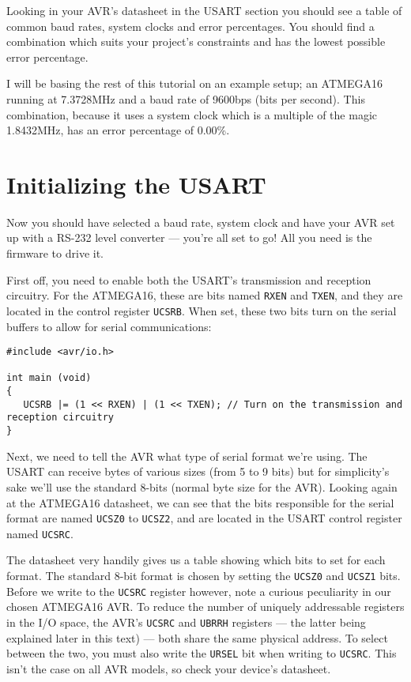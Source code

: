 \documentclass[a4paper,oneside]{book}
\begin{document}
Looking in your AVR's datasheet in the USART section you should see a table of common baud rates, system clocks and error percentages. You should find a combination which suits your project's constraints and has the lowest possible error percentage.

I will be basing the rest of this tutorial on an example setup; an ATMEGA16 running at 7.3728MHz and a baud rate of 9600bps (bits per second). This combination, because it uses a system clock which is a multiple of the magic 1.8432MHz, has an error percentage of 0.00\%.


\chapter{Initializing the USART}

Now you should have selected a baud rate, system clock and have your AVR set up with a RS-232 level converter --- you're all set to go! All you need is the firmware to drive it.

First off, you need to enable both the USART's transmission and reception circuitry. For the ATMEGA16, these are bits named \texttt{RXEN} and \texttt{TXEN}, and they are located in the control register \texttt{UCSRB}. When set, these two bits turn on the serial buffers to allow for serial communications:

\begin{center}
\begin{lstlisting}
#include <avr/io.h>

int main (void)
{
   UCSRB |= (1 << RXEN) | (1 << TXEN); // Turn on the transmission and reception circuitry
}
\end{lstlisting}
\end{center}

Next, we need to tell the AVR what type of serial format we're using. The USART can receive bytes of various sizes (from 5 to 9 bits) but for simplicity's sake we'll use the standard 8-bits (normal byte size for the AVR). Looking again at the ATMEGA16 datasheet, we can see that the bits responsible for the serial format are named \texttt{UCSZ0} to \texttt{UCSZ2}, and are located in the USART control register named \texttt{UCSRC}.

The datasheet very handily gives us a table showing which bits to set for each format. The standard 8-bit format is chosen by setting the \texttt{UCSZ0} and \texttt{UCSZ1} bits. Before we write to the \texttt{UCSRC} register however, note a curious peculiarity in our chosen ATMEGA16 AVR. To reduce the number of uniquely addressable registers in the I/O space, the AVR's \texttt{UCSRC} and \texttt{UBRRH} registers --- the latter being explained later in this text) --- both share the same physical address. To select between the two, you must also write the \texttt{URSEL} bit when writing to \texttt{UCSRC}. This isn't the case on all AVR models, so check your device's datasheet.
\end{document}
